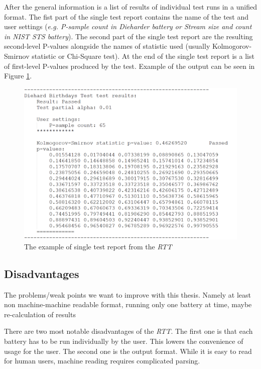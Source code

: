 \documentclass[
  digital,     %
  oneside,     %
  nosansbold,  %
  nocolorbold, %
  nolof,         %
  nolot,         %
]{fithesis4}
\begin{document}
After the general information is a list of results of individual test runs in a unified format. The fist part of the single test report contains the name of the test and user settings (\emph{e.g. P-sample count in Dieharder battery or Stream size and count in NIST STS battery}). The second part of the single test report are the resulting second-level P-values alongside the names of statistic used (usually Kolmogorov-Smirnov statistic or Chi-Square test). At the end of the single test report is a list of first-level P-values produced by the test. Example of the output can be seen in Figure \ref{fig:rtt_output_example}.

\begin{figure}
  \begin{center}
    \includegraphics[width=12cm]{figures/rtt_dieharder_output.png}
  \end{center}
  \caption{The example of single test report from the \emph{RTT}}
  \label{fig:rtt_output_example}
\end{figure}

\subsection{Disadvantages}
The problems/weak points we want to improve with this thesis. Namely at least non machine-machine readable format, running only one battery at time, maybe re-calculation of results

There are two most notable disadvantages of the \emph{RTT}. The first one is that each battery has to be run individually by the user. This lowers the convenience of usage for the user. The second one is the output format. While it is easy to read for human users, machine reading requires complicated parsing. 
\end{document}
